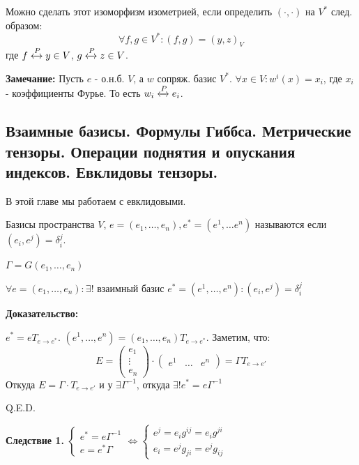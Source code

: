Можно сделать этот изоморфизм изометрией, если определить $(\cdot,\cdot)$ на $V^*$ след. образом:
$$\forall f,g \in V^* : (f,g) = (y,z)_V$$
где $f \xleftrightarrow{P}y \in V$, $g \xleftrightarrow{P}z\in V$.


\textbf{Замечание:} Пусть $e$ - о.н.б. $V$, а $w$ сопряж. базис $V^*$. $\forall x \in V: w^i(x) = x_i$, где $x_i$ - коэффициенты Фурье. То есть $w_i \xleftrightarrow[]{P}e_i$.



\pagebreak
\subsection{Взаимные базисы. Формулы Гиббса. Метрические тензоры. Операции поднятия и опускания индексов. Евклидовы тензоры.}

В этой главе мы работаем с евклидовыми.

 Базисы пространства $V$, $e = (e_1,\ldots,e_n), e^* = (e^1,\ldots e^n)$ называются  если $(e_i,e^j) = \delta_i^j$.

$\Gamma = G(e_1,\ldots ,e_n)$



$\forall e = (e_1,\ldots, e_n): \exists!$ взаимный базис $e^* = (e^1,\ldots, e^n): (e_i,e^j) = \delta_i^j$ 

\textbf{Доказательство:}

$e^* = e T_{e\rightarrow e^*}$. $(e^1,\ldots, e^n) = (e_1,\ldots, e_n)T_{e\rightarrow e^*}$. Заметим, что:
$$E = \begin{pmatrix}
    e_1\\
    \vdots\\
    e_n
\end{pmatrix} \cdot \begin{pmatrix}
    e^1 & \ldots & e^n
\end{pmatrix} = \Gamma T_{e\rightarrow e'}$$
Откуда $E = \Gamma \cdot T_{e\rightarrow e'}$ и у $\exists \Gamma^{-1}$, откуда $\exists! e^* =e \Gamma^{-1}$

\hfill Q.E.D.

\textbf{Следствие 1.}
$\begin{cases}
    e^* = e \Gamma^{-1}\\
    e = e^* \Gamma
\end{cases} \Leftrightarrow \begin{cases}
    e^j =e_i g^{ij}= e_i g^{ji}\\
    e_i = e^j g_{ji} = e^j g_{ij}
\end{cases}$

